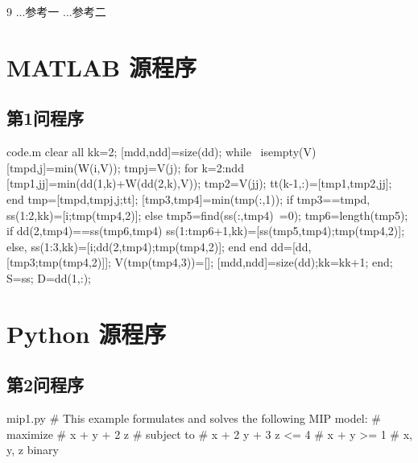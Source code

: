 \documentclass[bwprint]{gmcmthesis}
\begin{document}
\begin{thebibliography}{9}  %
  ...参考一
  ...参考二
\end{thebibliography}


\clearpage


\begin{appendices}  %
    \section{MATLAB 源程序}    %
    \renewcommand{\thesubsection}{A\thinskip.\thinskip\arabic{subsection}}
        \subsection{第1问程序}  %
        \vspace{-2ex}
        
        \begin{Matlab}{code.m}
        clear all
        kk=2;
        [mdd,ndd]=size(dd);
        while ~isempty(V)
            [tmpd,j]=min(W(i,V));
            tmpj=V(j);
            for k=2:ndd
                [tmp1,jj]=min(dd(1,k)+W(dd(2,k),V));
                tmp2=V(jj);
                tt(k-1,:)=[tmp1,tmp2,jj];
            end
            tmp=[tmpd,tmpj,j;tt];
            [tmp3,tmp4]=min(tmp(:,1));
            if tmp3==tmpd,
                ss(1:2,kk)=[i;tmp(tmp4,2)];
            else
                tmp5=find(ss(:,tmp4)~=0);
                tmp6=length(tmp5);
                if dd(2,tmp4)==ss(tmp6,tmp4)
                    ss(1:tmp6+1,kk)=[ss(tmp5,tmp4);tmp(tmp4,2)];
                else, ss(1:3,kk)=[i;dd(2,tmp4);tmp(tmp4,2)];
                end
            end
            dd=[dd,[tmp3;tmp(tmp4,2)]];
            V(tmp(tmp4,3))=[];
            [mdd,ndd]=size(dd);kk=kk+1;
        end;
        S=ss; D=dd(1,:);
        \end{Matlab}
        \vspace{2ex}
    
    \clearpage
    \section{Python 源程序}    %
    \renewcommand{\thesubsection}{B\thinskip.\thinskip\arabic{subsection}}
        \subsection{第2问程序}  %
        \vspace{-2ex}
        \begin{Python}{mip1.py}
        # This example formulates and solves the following  MIP model:
        #  maximize
        #        x +   y + 2 z
        #  subject to
        #        x + 2 y + 3 z <= 4
        #        x +   y       >= 1
        #        x, y, z binary
        

\end{Python}
\end{appendices}
\end{document}
